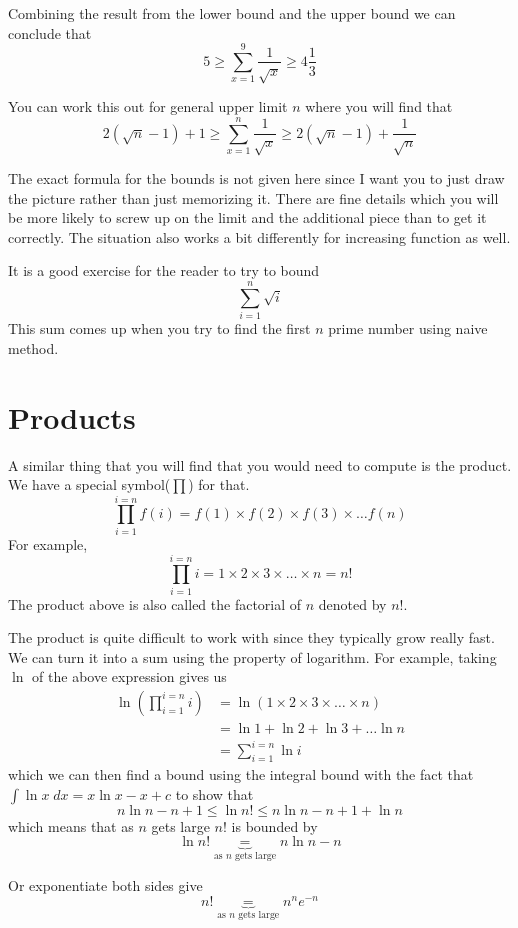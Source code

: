 \documentclass[a4paper, 12pt]{article}
\begin{document}
\begin{multicols}{2}
Combining the result from the lower bound and the upper bound we can conclude that
\[
 5 \ge \sum_{x=1}^{9} \frac{1}{\sqrt{x}} \ge 4\frac{1}{3}
\]

You can work this out for general upper limit $n$ where you will find that
\[
	2 \left( \sqrt{n} - 1 \right )+ 1 \ge \sum_{x=1}^{n} \frac{1}{\sqrt{x}} \ge 2 \left( \sqrt{n} -1  \right )+ \frac{1}{\sqrt{n}}
\]

The exact formula for the bounds is not given here since I want you to just draw the picture rather than just memorizing it. There are fine details which you will be more likely to screw up on the limit and the additional piece than to get it correctly. The situation also works a bit differently for increasing function as well.

It is a good exercise for the reader to try to bound
\[
	\sum_{i=1}^{n} \sqrt{i} 
\]
This sum comes up when you try to find the first $n$ prime number using naive method.

\section*{Products}
A similar thing that you will find that you would need to compute is the product. We have a special symbol($\prod$) for that.
\[
	\prod_{i=1}^{i=n} f(i) = f(1)\times f(2)\times f(3)\times \ldots f(n)
\]
For example,
\[
\prod_{i=1}^{i=n} i = 1 \times  2 \times 3 \times \ldots \times n = n!
\]
The product above is also called the factorial of $n$ denoted by $n!$.

The product is quite difficult to work with since they typically grow really fast. We can turn it into a sum using the property of logarithm. For example, taking $\ln$ of the above expression gives us
\begin{align*}
	\ln(\prod_{i=1}^{i=n} i) &= \ln(1 \times  2 \times 3 \times \ldots \times n)\\
	&= \ln 1 + \ln 2 + \ln 3 + \ldots \ln n\\
	&= \sum_{i=1}^{i=n} \ln i
\end{align*}
which we can then find a bound using the integral bound with the fact that $\int \ln x\; dx = x\ln x -x +c $ to show that
\[
	n\ln n -n +1 \le \ln n!  \le n \ln n  -n + 1 + \ln n
\]
which means that as $n$ gets large $n!$ is bounded by
\[
	\ln n! \underbrace{=}_{\text{as $n$ gets large}} n\ln n - n
\]

Or exponentiate both sides give
\[
	n! \underbrace{=}_{\text{as $n$ gets large}} n^n e^{-n}
\]



\end{multicols}
\end{document}
